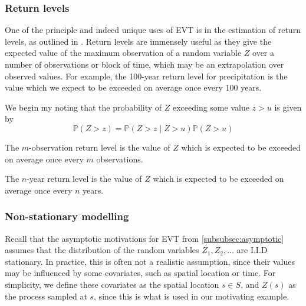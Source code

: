 \documentclass{article}
\numberwithin{equation}{section}
\begin{document}

\subsubsection{Return levels}

One of the principle and indeed unique uses of EVT is in the estimation of return levels, as outlined in \cite{Coles2001}. 
Return levels are immensely useful as they give the expected value of the maximum observation of a random variable $Z$ over a number of observations or block of time, which may be an extrapolation over observed values. 
For example, the 100-year return level for precipitation is the value which we expect to be exceeded on average once every 100 years. 

We begin my noting that the probability of $Z$ exceeding some value $z > u$ is given by 
\[
  \mathbb{P}(Z > z) = \mathbb{P}(Z > z \mid Z > u) \mathbb{P}(Z > u)
\]

The $m$-observation return level is the value of $Z$ which is expected to be exceeded on average once every $m$ observations.

The $n$-year return level is the value of $Z$ which is expected to be exceeded on average once every $n$ years.


\subsubsection{Non-stationary modelling} \label{subsubsec:non_stationary}

Recall that the asymptotic motivations for EVT from \ref{subsubsec:asymptotic} assumes that the distribution of the random variables $Z_1, Z_2, \ldots$ are I.I.D stationary.
In practice, this is often not a realistic assumption, since their values may be influenced by some covariates, such as spatial location or time.
For simplicity, we define these covariates as the spatial location $s \in S$, and $Z(s)$ as the process sampled at $s$, since this is what is used in our motivating example. 
\end{document}
